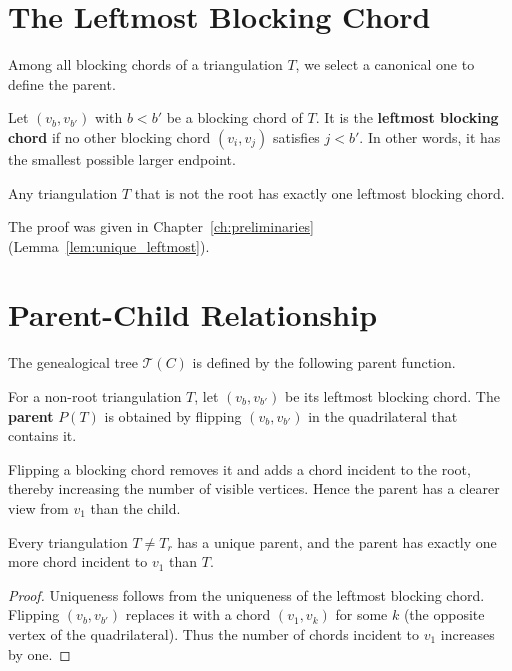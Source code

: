 \section{The Leftmost Blocking Chord}
\label{sec:leftmost_blocking_cycle}

Among all blocking chords of a triangulation \(T\), we select a canonical one to define the parent.

\begin{definition}
    \label{def:leftmost_blocking_cycle}
    Let \((v_b, v_{b'})\) with \(b < b'\) be a blocking chord of \(T\). 
    It is the \textbf{leftmost blocking chord} if no other blocking chord \((v_i, v_j)\) satisfies \(j < b'\). 
    In other words, it has the smallest possible larger endpoint.
\end{definition}

\begin{lemma}[Uniqueness]
    Any triangulation \(T\) that is not the root has exactly one leftmost blocking chord.
\end{lemma}

The proof was given in Chapter~\ref{ch:preliminaries} (Lemma~\ref{lem:unique_leftmost}).

\section{Parent-Child Relationship}
\label{sec:parent_child_cycle}

The genealogical tree \(\mathcal{T}(C)\) is defined by the following parent function.

\begin{definition}
    For a non-root triangulation \(T\), let \((v_b, v_{b'})\) be its leftmost blocking chord. 
    The \textbf{parent} \(P(T)\) is obtained by flipping \((v_b, v_{b'})\) in the quadrilateral that contains it.
\end{definition}

Flipping a blocking chord removes it and adds a chord incident to the root, thereby increasing the number of visible vertices. 
Hence the parent has a clearer view from \(v_1\) than the child.

\begin{lemma}
    Every triangulation \(T \neq T_r\) has a unique parent, and the parent has exactly one more chord incident to \(v_1\) than \(T\).
\end{lemma}

\begin{proof}
    Uniqueness follows from the uniqueness of the leftmost blocking chord. 
    Flipping \((v_b, v_{b'})\) replaces it with a chord \((v_1, v_k)\) for some \(k\) (the opposite vertex of the quadrilateral). 
    Thus the number of chords incident to \(v_1\) increases by one.
\end{proof}

